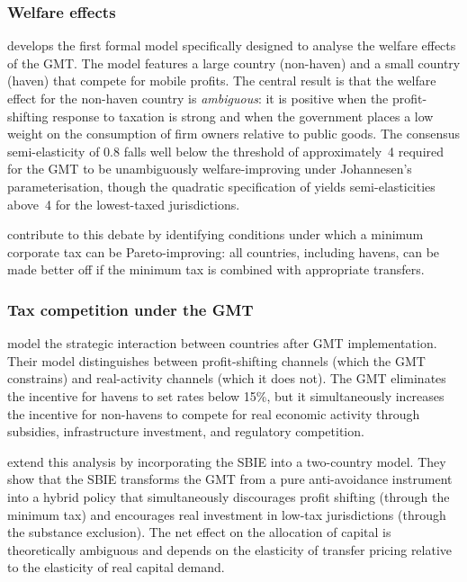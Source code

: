 \documentclass[11pt,a4paper]{article}
\begin{document}
\subsubsection{Welfare effects}

\citet{johannesen2022} develops the first formal model specifically designed to analyse the welfare effects of the GMT. The model features a large country (non-haven) and a small country (haven) that compete for mobile profits. The central result is that the welfare effect for the non-haven country is \textit{ambiguous}: it is positive when the profit-shifting response to taxation is strong and when the government places a low weight on the consumption of firm owners relative to public goods. The consensus semi-elasticity of 0.8 falls well below the threshold of approximately~4 required for the GMT to be unambiguously welfare-improving under Johannesen's parameterisation, though the quadratic specification of \citet{dowd2017} yields semi-elasticities above~4 for the lowest-taxed jurisdictions.

\citet{hebous2023} contribute to this debate by identifying conditions under which a minimum corporate tax can be Pareto-improving: all countries, including havens, can be made better off if the minimum tax is combined with appropriate transfers.

\subsubsection{Tax competition under the GMT}

\citet{janeba2023} model the strategic interaction between countries after GMT implementation. Their model distinguishes between profit-shifting channels (which the GMT constrains) and real-activity channels (which it does not). The GMT eliminates the incentive for havens to set rates below 15\%, but it simultaneously increases the incentive for non-havens to compete for real economic activity through subsidies, infrastructure investment, and regulatory competition.

\citet{schjelderup2024} extend this analysis by incorporating the SBIE into a two-country model. They show that the SBIE transforms the GMT from a pure anti-avoidance instrument into a hybrid policy that simultaneously discourages profit shifting (through the minimum tax) and encourages real investment in low-tax jurisdictions (through the substance exclusion). The net effect on the allocation of capital is theoretically ambiguous and depends on the elasticity of transfer pricing relative to the elasticity of real capital demand.
\end{document}
